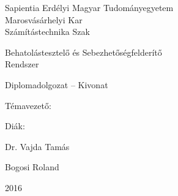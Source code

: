 
\renewcommand{\listoflistingscaption}{Kódrészletek jegyzéke}
\renewcommand{\listingscaption}{Kódrészlet}

\newpage
\pagestyle{empty}

	\begin{center}
		{\Large Sapientia Erdélyi Magyar Tudományegyetem}\\\vspace{0.07in}
		{\Large Marosvásárhelyi Kar}\\\vspace{0.07in}
		{\Large Számítástechnika Szak}\\
		
		\vspace{2.35in}
		
		{\huge Behatolástesztelő és Sebezhetőségfelderítő}\\\vspace{0.15in}
		{\huge Rendszer}
		
		\vspace{0.5in}
		
		{\LARGE Diplomadolgozat -- Kivonat}
		
	\end{center}
	
	\vspace{2.0in}
	
	\begin{multicols}{2}
		\begin{flushleft}
			{\Large Témavezető:}
		\end{flushleft}
		\columnbreak
		\begin{flushright}
			{\Large Diák:}
		\end{flushright}
	\end{multicols}
	\begin{multicols}{2}
		\begin{flushleft}
			{\LARGE Dr. Vajda Tamás}
		\end{flushleft}
		\columnbreak
		\begin{flushright}
			{\LARGE Bogosi Roland}
		\end{flushright}
	\end{multicols}
	
	\vspace{1.5in}
		
	\begin{center}
		{\LARGE 2016}
	\end{center}

\newpage

